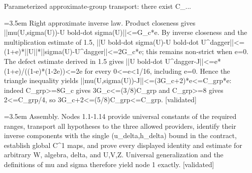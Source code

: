 \documentclass{article}
\newcommand{\step}[1]{\par\noindent\hangindent=3.5em\hangafter=1%
  \makebox[3.5em][l]{\textbf{#1.}}}
\newcommand{\steptag}[1]{\hfill{\small\textsf{[#1]}}}
\begin{document}
\begin{proofbox}{Parameterized approximate-group transport: there exist C\_...}
\step{1.14} Right approximate inverse law. Product closeness gives ||mu(U,sigma(U))-U bold-dot sigma(U)||<=G\_c*e. By inverse closeness and the multiplication estimate of 1.5, ||U bold-dot sigma(U)-U bold-dot U\textasciicircum{}dagger||<=(1+e)*||U||*||sigma(U)-U\textasciicircum{}dagger||<=2G\_c*e; this remains non-strict when e=0. The defect estimate derived in 1.5 gives ||U bold-dot U\textasciicircum{}dagger-J||<=e*(1+e)/((1-e)*(1-2e))<=2e for every 0<=e<1/16, including e=0. Hence the triangle inequality yields ||mu(U,sigma(U))-J||<=(3G\_c+2)*e<=C\_grp*e: indeed C\_grp>=8G\_c gives 3G\_c<=(3/8)C\_grp and C\_grp>=8 gives 2<=C\_grp/4, so 3G\_c+2<=(5/8)C\_grp<=C\_grp. \steptag{validated} \\[4pt]
\step{1.15} Assembly. Nodes 1.1-1.14 provide universal constants of the required ranges, transport all hypotheses to the three allowed providers, identify their inverse components with the single (u\_delta,h\_delta) bound in the contract, establish global C\textasciicircum{}1 maps, and prove every displayed identity and estimate for arbitrary W, algebra, delta, and U,V,Z. Universal generalization and the definitions of mu and sigma therefore yield node 1 exactly. \steptag{validated} \\[4pt]
\end{proofbox}
\end{document}
